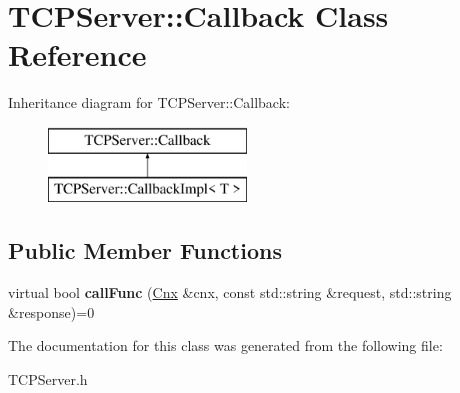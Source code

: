 \hypertarget{classTCPServer_1_1Callback}{\section{T\-C\-P\-Server\-:\-:Callback Class Reference}
\label{classTCPServer_1_1Callback}
}
Inheritance diagram for T\-C\-P\-Server\-:\-:Callback\-:\begin{figure}[H]
\begin{center}
\leavevmode
\includegraphics[height=2.000000cm]{classTCPServer_1_1Callback}
\end{center}
\end{figure}
\subsection*{Public Member Functions}
\begin{DoxyCompactItemize}
\item 
\hypertarget{classTCPServer_1_1Callback_a0d26469a5cfb3f5f0b3529cacb5d1615}{virtual bool {\bfseries call\-Func} (\hyperlink{classTCPServer_1_1Cnx}{Cnx} \&cnx, const std\-::string \&request, std\-::string \&response)=0}\label{classTCPServer_1_1Callback_a0d26469a5cfb3f5f0b3529cacb5d1615}

\end{DoxyCompactItemize}


The documentation for this class was generated from the following file\-:\begin{DoxyCompactItemize}
\item 
T\-C\-P\-Server.\-h\end{DoxyCompactItemize}
